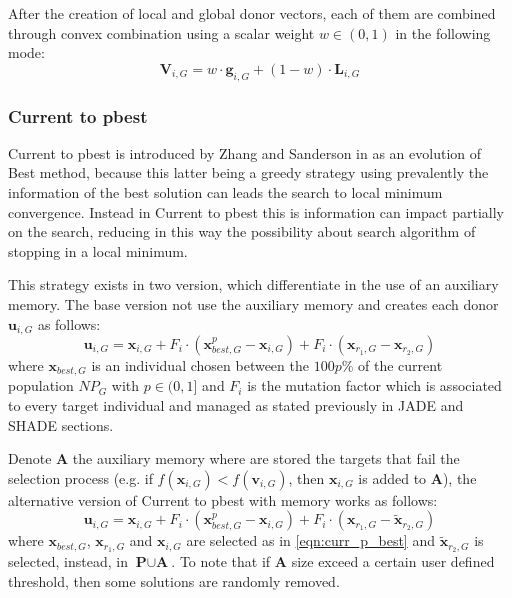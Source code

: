 After the creation of local and global donor vectors, each of them are combined through convex combination using a scalar weight $w \in (0, 1)$ in the following mode:
\begin{equation}
	\textbf{V}_{i, G} = w \cdot \textbf{g}_{i, G} + (1 - w) \cdot \textbf{L}_{i, G}
\end{equation}

\subsubsection{Current to pbest}\label{subsubsec:curr_p_best}
Current to pbest is introduced by Zhang and Sanderson in \cite{JADE:2009} as an evolution of Best method, because this latter being a greedy strategy using prevalently the information of the best solution can leads the search to local minimum convergence. Instead in Current to pbest this is information can impact partially on the search, reducing in this way the possibility about search algorithm of stopping in a local minimum.

This strategy exists in two version, which differentiate in the use of an auxiliary memory. The base version not use the auxiliary memory and creates each donor $\textbf{u}_{i, G}$ as follows:
\begin{equation}
	\textbf{u}_{i, G} = \textbf{x}_{i, G} + F_i \cdot (\textbf{x}_{\textit{best}, G}^p - \textbf{x}_{i, G}) + F_i \cdot (\textbf{x}_{r_1, G} - \textbf{x}_{r_2, G})
\end{equation}\label{eqn:curr_p_best}
where $\textbf{x}_{\textit{best}, G}$ is an individual chosen between the $100p\%$ of the current population $\textit{NP}_{G}$ with $p \in (0, 1]$ and $F_i$ is the mutation factor which is associated to every target individual and managed as stated previously in JADE and SHADE sections.

Denote \textbf{A} the auxiliary memory where are stored the targets that fail the selection process (e.g. if $f(\textbf{x}_{i, G}) < f(\textbf{v}_{i, G})$, then $\textbf{x}_{i, G}$ is added to $\textbf{A}$), the alternative version of Current to pbest with memory works as follows:
\begin{equation}
	\textbf{u}_{i, G} = \textbf{x}_{i, G} + F_i \cdot (\textbf{x}_{\textit{best}, G}^{p} - \textbf{x}_{i, G}) + F_i \cdot (\textbf{x}_{r_1, G} - \tilde{\textbf{x}}_{r_2, G})
\end{equation}
where $\textbf{x}_{\textit{best}, G}$, $\textbf{x}_{r_1, G}$ and $\textbf{x}_{i, G}$ are selected as in \ref{eqn:curr_p_best} and $\tilde{\textbf{x}}_{r_2, G}$ is selected, instead, in $\textbf{P} \cup \textbf{A}$. To note that if $\textbf{A}$ size exceed a certain user defined threshold, then some solutions are randomly removed.

